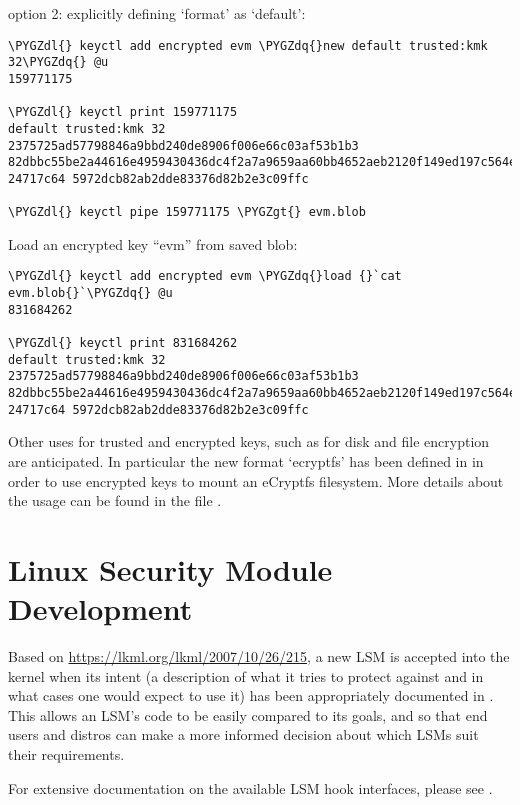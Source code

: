 \documentclass[a4paper,8pt,english]{sphinxmanual}
\def\PYGZgt{\char`\>}
\def\PYGZdl{\char`\$}
\def\PYGZdq{\char`\"}
\begin{document}
option 2: explicitly defining `format' as `default':

\begin{Verbatim}[commandchars=\\\{\}]
\PYGZdl{} keyctl add encrypted evm \PYGZdq{}new default trusted:kmk 32\PYGZdq{} @u
159771175

\PYGZdl{} keyctl print 159771175
default trusted:kmk 32 2375725ad57798846a9bbd240de8906f006e66c03af53b1b3
82dbbc55be2a44616e4959430436dc4f2a7a9659aa60bb4652aeb2120f149ed197c564e0
24717c64 5972dcb82ab2dde83376d82b2e3c09ffc

\PYGZdl{} keyctl pipe 159771175 \PYGZgt{} evm.blob
\end{Verbatim}

Load an encrypted key ``evm'' from saved blob:

\begin{Verbatim}[commandchars=\\\{\}]
\PYGZdl{} keyctl add encrypted evm \PYGZdq{}load {}`cat evm.blob{}`\PYGZdq{} @u
831684262

\PYGZdl{} keyctl print 831684262
default trusted:kmk 32 2375725ad57798846a9bbd240de8906f006e66c03af53b1b3
82dbbc55be2a44616e4959430436dc4f2a7a9659aa60bb4652aeb2120f149ed197c564e0
24717c64 5972dcb82ab2dde83376d82b2e3c09ffc
\end{Verbatim}

Other uses for trusted and encrypted keys, such as for disk and file encryption
are anticipated.  In particular the new format `ecryptfs' has been defined in
in order to use encrypted keys to mount an eCryptfs filesystem.  More details
about the usage can be found in the file
.


\chapter{Linux Security Module Development}
\label{security/LSM::doc}\label{security/LSM:linux-security-module-development}
Based on \href{https://lkml.org/lkml/2007/10/26/215}{https://lkml.org/lkml/2007/10/26/215},
a new LSM is accepted into the kernel when its intent (a description of
what it tries to protect against and in what cases one would expect to
use it) has been appropriately documented in .
This allows an LSM's code to be easily compared to its goals, and so
that end users and distros can make a more informed decision about which
LSMs suit their requirements.

For extensive documentation on the available LSM hook interfaces, please
see .
\end{document}

